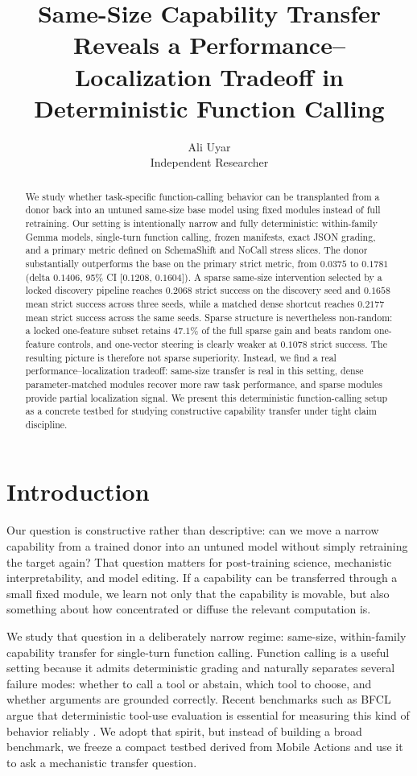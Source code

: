\documentclass{article}
\title{Same-Size Capability Transfer Reveals a Performance--Localization Tradeoff in Deterministic Function Calling}
\author{Ali Uyar\\Independent Researcher}
\begin{document}
\maketitle

\begin{abstract}
We study whether task-specific function-calling behavior can be transplanted from a donor back into an untuned same-size base model using fixed modules instead of full retraining. Our setting is intentionally narrow and fully deterministic: within-family Gemma models, single-turn function calling, frozen manifests, exact JSON grading, and a primary metric defined on SchemaShift and NoCall stress slices. The donor substantially outperforms the base on the primary strict metric, from $0.0375$ to $0.1781$ (delta $0.1406$, 95\% CI [$0.1208$, $0.1604$]). A sparse same-size intervention selected by a locked discovery pipeline reaches $0.2068$ strict success on the discovery seed and $0.1658$ mean strict success across three seeds, while a matched dense shortcut reaches $0.2177$ mean strict success across the same seeds. Sparse structure is nevertheless non-random: a locked one-feature subset retains $47.1\%$ of the full sparse gain and beats random one-feature controls, and one-vector steering is clearly weaker at $0.1078$ strict success. The resulting picture is therefore not sparse superiority. Instead, we find a real performance--localization tradeoff: same-size transfer is real in this setting, dense parameter-matched modules recover more raw task performance, and sparse modules provide partial localization signal. We present this deterministic function-calling setup as a concrete testbed for studying constructive capability transfer under tight claim discipline.
\end{abstract}

\section{Introduction}
Our question is constructive rather than descriptive: can we move a narrow capability from a trained donor into an untuned model without simply retraining the target again? That question matters for post-training science, mechanistic interpretability, and model editing. If a capability can be transferred through a small fixed module, we learn not only that the capability is movable, but also something about how concentrated or diffuse the relevant computation is.

We study that question in a deliberately narrow regime: same-size, within-family capability transfer for single-turn function calling. Function calling is a useful setting because it admits deterministic grading and naturally separates several failure modes: whether to call a tool or abstain, which tool to choose, and whether arguments are grounded correctly. Recent benchmarks such as BFCL argue that deterministic tool-use evaluation is essential for measuring this kind of behavior reliably \citep{patil2025bfcl}. We adopt that spirit, but instead of building a broad benchmark, we freeze a compact testbed derived from Mobile Actions \citep{google2025mobileactions} and use it to ask a mechanistic transfer question.
\end{document}

